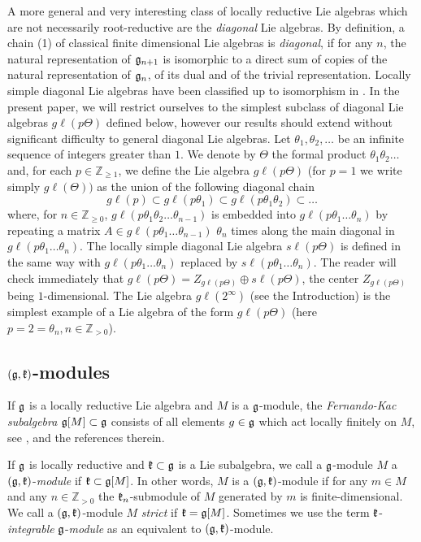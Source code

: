\documentclass[12pt]{article}
\newcommand {\ZZ} {\mathbb {Z}}
\newcommand{\gl}{{g\ell}}
\begin{document}
A more general and very interesting class of locally reductive Lie algebras which are not necessarily root-reductive are the {\it diagonal} Lie algebras.  By definition, a chain (1) of classical finite dimensional Lie algebras is {\it diagonal}, if for any $n$, the natural representation of $\frak g_{n+1}$ is isomorphic to a direct sum of copies of the natural representation of $\frak g_n$, of its dual and of the trivial representation.  Locally simple diagonal Lie algebras have been classified up to isomorphism in \cite{BZh}.  In the present paper, we will restrict ourselves to the simplest subclass of diagonal Lie algebras $\gl (p\Theta)$ defined below, however our results should extend without significant difficulty to general diagonal Lie algebras.  Let $\theta_1,\theta_2,\ldots$ be an infinite sequence of integers greater than $1$.  We denote by $\Theta$ the formal product $\theta_1\theta_2\ldots$ and, for each $p\in\ZZ_{\geq 1}$, we define the Lie algebra $\gl (p\Theta)
 $ (for $p=1$ we write simply $\gl (\Theta))$ as the union of the following diagonal chain
$$
\gl (p)\subset \gl (p\theta_1)\subset \gl (p\theta_1\theta_2)\subset\ldots
$$
where, for $n\in\ZZ_{\geq 0}$, $\gl (p\theta_1\theta_2\ldots \theta_{n-1})$ is embedded into $\gl (p\theta_1\ldots\theta_{n})$ by repeating a matrix $A\in \gl (p \theta_1\ldots\theta_{n-1}) \,\,  \theta_{n}$ times along the main diagonal in $\gl (p \theta_1\ldots \theta_{n})$.  The locally simple diagonal Lie algebra $s\ell (p\Theta )$ is defined in the same way with $\gl (p \theta_1\ldots\theta_n)$ replaced by $s\ell (p \theta_1\ldots\theta_n)$. The reader will check immediately that $\gl (p\Theta ) = Z_{\gl(p\Theta)}\oplus s\ell (p\Theta)$, the center $Z_{\gl (p\Theta)}$ being $1$-dimensional.  The Lie algebra $\gl (2^\infty)$ (see the Introduction) is the simplest example of a Lie algebra of the form $g\ell (p\Theta)$ (here $p=2=\theta_n, n\in\ZZ_{> 0}$).

\subsection{$(\frak g,\frak k)$-modules}  If $\frak g$ is a locally reductive Lie algebra and $M$ is a $\frak g$-module, the {\it Fernando-Kac subalgebra} $\frak g [M]\subset\frak g$ consists of all elements $g\in\frak g$ which act locally finitely on $M$, see \cite{F}, \cite{DMP} and the references therein.

If $\frak g$ is locally reductive and $\frak k\subset\frak g$ is a Lie subalgebra, we call a $\frak g$-module $M$ a $(\frak g,\frak k)$-{\it module} if $\frak k\subset\frak g [M]$.  In other words, $M$ is a $(\frak g,\frak k)$-module if for any $m\in M$ and any $n\in\ZZ_{>0}$ the $\frak k_n$-submodule of $M$ generated by $m$ is finite-dimensional.  We call a $(\frak g,\frak k)$-module $M$ {\it strict} if $\frak k = \frak g [M]$. Sometimes we use the term $\frak k$-{\it integrable} $\frak g$-{\it module} as an equivalent to $(\frak g,\frak k)$-module.
\end{document}
